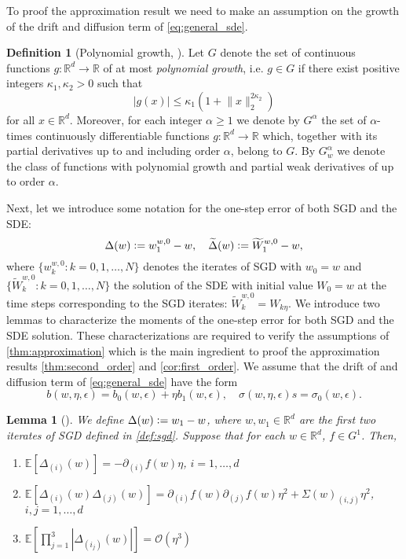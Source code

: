 \documentclass[12pt]{article}
\newtheorem{lemma}[lemma]{Lemma}
\theoremstyle{definition}
\newtheorem{definition}[definition]{Definition}
\numberwithin{equation}{section}
\newcommand{\R}{\mathbb{R}}
\newcommand{\ev}[1]{\mathbb{E}\left[{#1}\right]}
\newcommand{\norm}[1]{\lVert{#1}\rVert_2}
\newcommand{\defeq}{\vcentcolon=}
\begin{document}
To proof the approximation result we need to make an assumption on the growth of the drift and diffusion term of \eqref{eq:general_sde}. 
\begin{definition}[Polynomial growth, ]
  Let $G$ denote the set of continuous functions $g : \R^d \rightarrow \R$ of at most \emph{polynomial growth}, i.e. $g \in G$ if there exist positive integers $\kappa_1, \kappa_2 > 0$ such that
  \begin{equation*}
    |g(x)| \leq \kappa_1(1 + \norm{x}^{2\kappa_2})
  \end{equation*} 
  for all $x \in \R^d$. Moreover, for each integer $\alpha \geq 1$ we denote by $G^{\alpha}$ the set of $\alpha$-times continuously differentiable functions $g : \R^d \rightarrow \R$ which, together with its partial derivatives up to and including order $\alpha$, belong to $G$. By $G^{\alpha}_w$ we denote the class of functions with polynomial growth and partial weak derivatives of up to order $\alpha$. 
\end{definition}
Next, let we introduce some notation for the one-step error of both SGD and the SDE:
\begin{equation*}
  \Delta(w) \defeq w_{1}^{w,0} - w, \quad \widetilde{\Delta}(w) \defeq \widetilde{W}^{w,0}_1 - w,
\end{equation*}
where $\{w_k^{w,0}: k = 0,1,\dots, N\}$ denotes the iterates of SGD with $w_0 = w$ and $\{\widetilde{W}_k^{w,0}: k = 0,1,\dots, N\}$ the solution of the SDE with initial value $W_0 = w$ at the time steps corresponding to the SGD iterates: $\widetilde{W}_k^{w,0} = W_{k\eta}$.
We introduce two lemmas to characterize the moments of the one-step error for both SGD and the SDE solution. These characterizations are required to verify the assumptions of \autoref{thm:approximation} which is the main ingredient to proof the approximation results \autoref{thm:second_order} and \autoref{cor:first_order}. We assume that the drift of and diffusion term of \eqref{eq:general_sde} have the form 
\begin{equation*}
  b(w,\eta, \epsilon) = b_0(w, \epsilon) + \eta b_1(w, \epsilon), \quad \sigma(w,\eta, \epsilon) s= \sigma_0(w, \epsilon).
\end{equation*}
\begin{lemma}[]
  \label{lem:sgd_one_step}
  We define $\Delta(w) \defeq w_{1} - w$, where $w, w_{1} \in \R^d$ are the first two iterates of SGD defined in \autoref{def:sgd}. Suppose that for each $w \in \R^d$, $f \in G^1$. Then,
  \begin{enumerate}[label=(\roman*)]
    \item $\ev{\Delta_{(i)}(w)} = -\partial_{(i)} f(w) \eta$, $i = 1,\dots,d$
    \item $\ev{\Delta_{(i)}(w)\Delta_{(j)}(w)} = \partial_{(i)} f(w)\partial_{(j)} f(w) \eta^2 + \Sigma(w)_{(i,j)}\eta^2$, $i,j = 1,\dots,d$
    \item $\ev{\prod_{j=1}^3\left\lvert \Delta_{(i_j)}(w)\right\rvert} = \mathcal{O}(\eta^3)$
  \end{enumerate}
\end{lemma}
\end{document}
